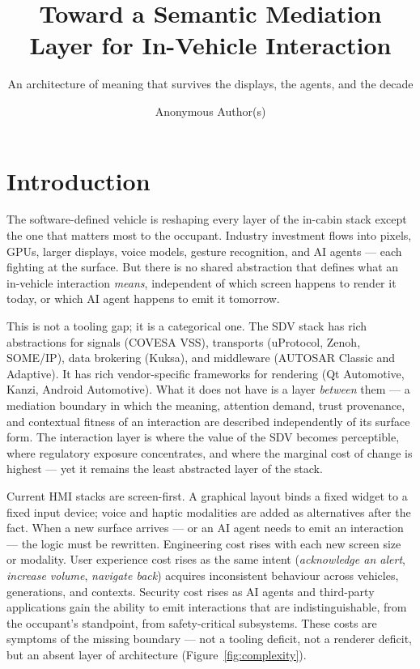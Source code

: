 \documentclass[manuscript,screen,review,anonymous]{acmart}
\title{Toward a Semantic Mediation Layer for In-Vehicle Interaction}
\subtitle{An architecture of meaning that survives the displays, the agents, and the decade}
\author{Anonymous Author(s)}
\affiliation{\institution{Anonymous Institution}}
\begin{document}
\maketitle

\section{Introduction}

The software-defined vehicle is reshaping every layer of the in-cabin stack
except the one that matters most to the occupant. Industry investment flows
into pixels, GPUs, larger displays, voice models, gesture recognition, and
AI agents --- each fighting at the surface. But there is no shared abstraction
that defines what an in-vehicle interaction \emph{means}, independent of which
screen happens to render it today, or which AI agent happens to emit it
tomorrow.

This is not a tooling gap; it is a categorical one. The SDV stack has rich
abstractions for signals (COVESA VSS), transports (uProtocol, Zenoh, SOME/IP),
data brokering (Kuksa), and middleware (AUTOSAR Classic and Adaptive). It has
rich vendor-specific frameworks for rendering (Qt Automotive, Kanzi, Android
Automotive). What it does not have is a layer \emph{between} them --- a
mediation boundary in which the meaning, attention demand, trust provenance,
and contextual fitness of an interaction are described independently of its
surface form. The interaction layer is where the value of the SDV becomes
perceptible, where regulatory exposure concentrates, and where the marginal
cost of change is highest --- yet it remains the least abstracted layer of the
stack.

Current HMI stacks are screen-first. A graphical layout binds a fixed widget
to a fixed input device; voice and haptic modalities are added as alternatives
after the fact. When a new surface arrives --- or an AI agent needs to emit an
interaction --- the logic must be rewritten. Engineering cost rises with each
new screen size or modality. User experience cost rises as the same intent
(\emph{acknowledge an alert}, \emph{increase volume}, \emph{navigate back})
acquires inconsistent behaviour across vehicles, generations, and contexts.
Security cost rises as AI agents and third-party applications gain the ability
to emit interactions that are indistinguishable, from the occupant's
standpoint, from safety-critical subsystems. These costs are symptoms of the
missing boundary --- not a tooling deficit, not a renderer deficit, but an
absent layer of architecture (Figure~\ref{fig:complexity}).
\end{document}
